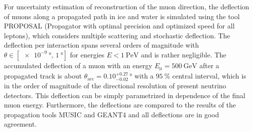 For uncertainty estimation of reconstruction of the muon direction, the 
deflection of muons along a propagated path in ice and water is simulated using 
the tool PROPOSAL (Propagator with optimal precision and optimized speed for all leptons), which considers multiple scattering and stochastic deflection. 
The deflection per interaction spans several 
orders of magnitude with $\theta \in [\SI{e-9}{\degree},\, \SI{1}{\degree}]$ 
for energies $E < \SI{1}{\peta\electronvolt}$ 
and is rather negligible. The accumulated 
deflection of a muon with an energy $E_{\mathrm{\mu}} = \SI{500}{\giga\electronvolt}$ 
after a propagated track is about $\theta_{\text{acc}} = 0.10_{-0.02}^{+0.27}\,\si{\degree}$ 
with a $\SI{95}{\percent}$ central interval, which is in the order of magnitude of 
the directional resolution of 
present neutrino detectors. This deflection can be simply parametrized in 
dependence of the final muon energy. Furthermore, the deflections are compared to the results 
of the propagation tools MUSIC and GEANT4 and all deflections are in good 
agreement. 
